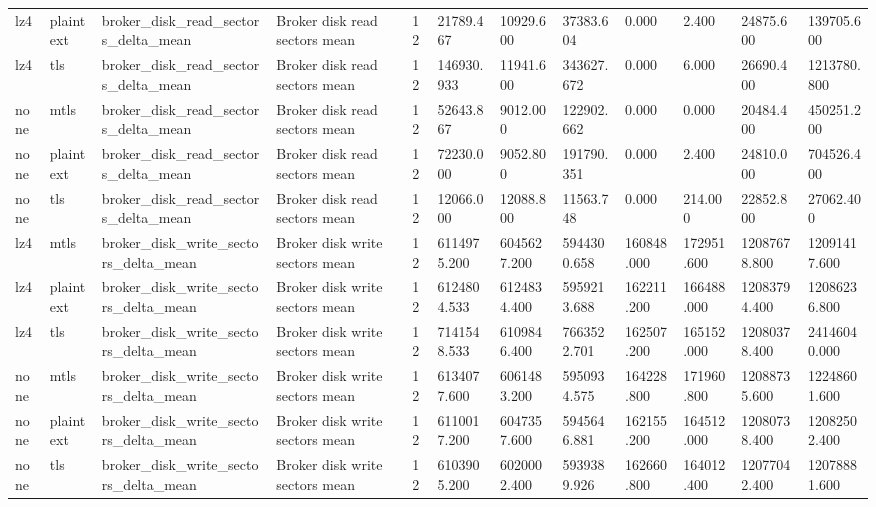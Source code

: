 \begin{longtable}{llllllllllll}
lz4 & plaintext & broker\_disk\_read\_sectors\_delta\_mean & Broker disk read sectors mean & 12 & 21789.467 & 10929.600 & 37383.604 & 0.000 & 2.400 & 24875.600 & 139705.600 \\
lz4 & tls & broker\_disk\_read\_sectors\_delta\_mean & Broker disk read sectors mean & 12 & 146930.933 & 11941.600 & 343627.672 & 0.000 & 6.000 & 26690.400 & 1213780.800 \\
none & mtls & broker\_disk\_read\_sectors\_delta\_mean & Broker disk read sectors mean & 12 & 52643.867 & 9012.000 & 122902.662 & 0.000 & 0.000 & 20484.400 & 450251.200 \\
none & plaintext & broker\_disk\_read\_sectors\_delta\_mean & Broker disk read sectors mean & 12 & 72230.000 & 9052.800 & 191790.351 & 0.000 & 2.400 & 24810.000 & 704526.400 \\
none & tls & broker\_disk\_read\_sectors\_delta\_mean & Broker disk read sectors mean & 12 & 12066.000 & 12088.800 & 11563.748 & 0.000 & 214.000 & 22852.800 & 27062.400 \\
lz4 & mtls & broker\_disk\_write\_sectors\_delta\_mean & Broker disk write sectors mean & 12 & 6114975.200 & 6045627.200 & 5944300.658 & 160848.000 & 172951.600 & 12087678.800 & 12091417.600 \\
lz4 & plaintext & broker\_disk\_write\_sectors\_delta\_mean & Broker disk write sectors mean & 12 & 6124804.533 & 6124834.400 & 5959213.688 & 162211.200 & 166488.000 & 12083794.400 & 12086236.800 \\
lz4 & tls & broker\_disk\_write\_sectors\_delta\_mean & Broker disk write sectors mean & 12 & 7141548.533 & 6109846.400 & 7663522.701 & 162507.200 & 165152.000 & 12080378.400 & 24146040.000 \\
none & mtls & broker\_disk\_write\_sectors\_delta\_mean & Broker disk write sectors mean & 12 & 6134077.600 & 6061483.200 & 5950934.575 & 164228.800 & 171960.800 & 12088735.600 & 12248601.600 \\
none & plaintext & broker\_disk\_write\_sectors\_delta\_mean & Broker disk write sectors mean & 12 & 6110017.200 & 6047357.600 & 5945646.881 & 162155.200 & 164512.000 & 12080738.400 & 12082502.400 \\
none & tls & broker\_disk\_write\_sectors\_delta\_mean & Broker disk write sectors mean & 12 & 6103905.200 & 6020002.400 & 5939389.926 & 162660.800 & 164012.400 & 12077042.400 & 12078881.600 \\
\hline
\end{longtable}
